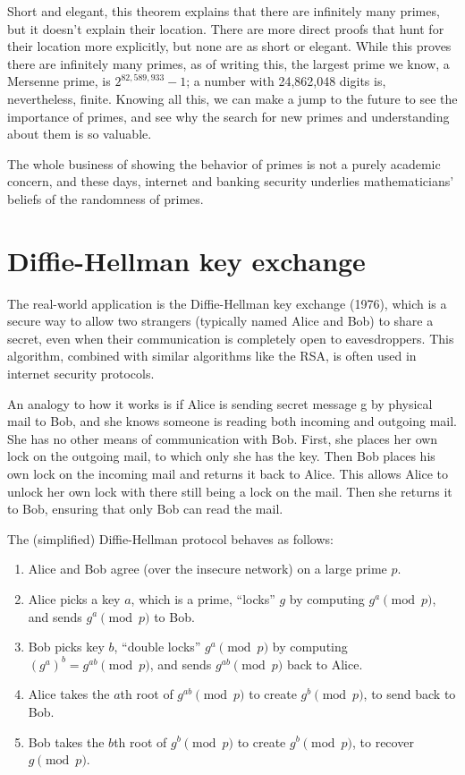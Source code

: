 Short and elegant, this theorem explains that there are infinitely many primes, but it doesn’t explain their location. There are more direct proofs that hunt for their location more explicitly, but none are as short or elegant. While this proves there are infinitely many primes, as of writing this, the largest prime we know, a Mersenne prime, is \(2^{82,589,933} - 1\); a number with 24,862,048 digits is, nevertheless, finite. Knowing all this, we can make a jump to the future to see the importance of primes, and see why the search for new primes and understanding about them is so valuable.

The whole business of showing the behavior of primes is not a purely academic concern, and these days, internet and banking security underlies mathematicians’ beliefs of the randomness of primes.  

\section*{Diffie-Hellman key exchange}

The real-world application is the Diffie-Hellman key exchange (1976), which is a secure way to allow two strangers (typically named Alice and Bob) to share a secret, even when their communication is completely open to eavesdroppers. This algorithm, combined with similar algorithms like the RSA, is often used in internet security protocols. 

An analogy to how it works is if Alice is sending secret message g by physical mail to Bob, and she knows someone is reading both incoming and outgoing mail. She has no other means of communication with Bob. First, she places her own lock on the outgoing mail, to which only she has the key. Then Bob places his own lock on the incoming mail and returns it back to Alice. This allows Alice to unlock her own lock with there still being a lock on the mail. Then she returns it to Bob, ensuring that only Bob can read the mail.  

The (simplified) Diffie-Hellman protocol behaves as follows:

\begin{enumerate}
    \item Alice and Bob agree (over the insecure network) on a large prime \(p\).
    \item Alice picks a key \(a\), which is a prime, “locks” \(g\) by computing \(g^a \pmod{p} \), and sends \(g^a \pmod{p} \) to Bob.
    \item Bob picks key \(b\), “double locks” \(g^a \pmod{p}\) by computing \((g^a)^b = g^{ab} \pmod{p} \), and sends \(g^{ab} \pmod{p} \) back to Alice.
    \item Alice takes the \(a\)th root of \(g^{ab} \pmod{p} \) to create \(g^b \pmod{p} \), to send back to Bob.
    \item Bob takes the \(b\)th root of \(g^b \pmod{p} \) to create \(g^b \pmod{p}\), to recover \(g \pmod{p}\).
\end{enumerate} 

